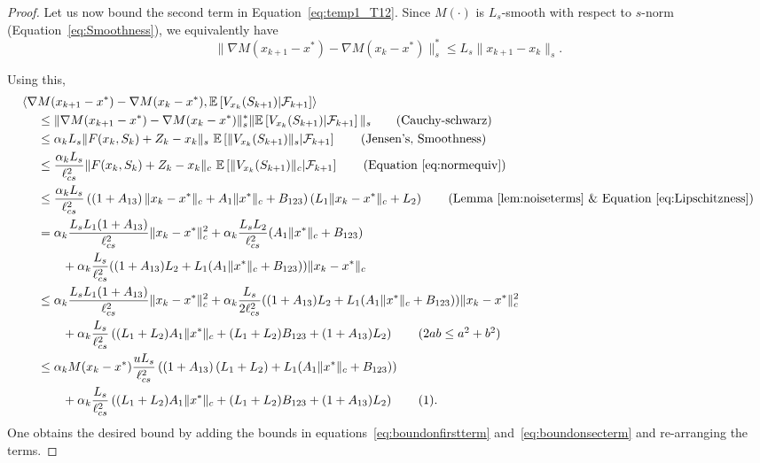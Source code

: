 \documentclass{article}
\newcommand{\numberthis}{\addtocounter{equation}{1}\tag{\theequation}}
\newcommand{\lrp}[1]{\left( #1 \right)}
\newcommand{\lrs}[1]{\left[ #1 \right]}
\newcommand{\E}[1]{\mathbb{E}\lrs{#1}}
\newcommand{\lcs}{\ell_{cs}}
\newcommand{\xk}{x_k}
\begin{document}
\begin{proof}
    Let us now bound the second term in Equation~\eqref{eq:temp1_T12}. Since $M(\cdot)$ is $L_s$-smooth with respect to $s$-norm (Equation~\eqref{eq:Smoothness}), we equivalently have \citep[Chapter 5]{beck2017first}
    \[ \|\nabla M(x_{k+1} - x^*) - \nabla M(x_k - x^*) \|^*_s  \le L_s\|x_{k+1}-x_k\|_s.\]

    Using this, 
    \begin{align*}
        \langle \nabla &M(x_{k+1} - x^*) - \nabla M(x_k - x^*), \E{ V_{x_k}(S_{k+1}) | \mathcal F_{k+1}} \rangle \\
        &\le \| \nabla M(x_{k+1} - x^*) - \nabla M(x_k - x^*)\|^*_{s} \| \E{ V_{x_k}(S_{k+1}) | \mathcal F_{k+1}} \|_s \tag{Cauchy-schwarz} \\
        &\le  \alpha_k L_s\|F(x_k, S_k) + Z_k - x_k\|_s ~\E{\|V_{x_k}(S_{k+1})\|_s  | \mathcal F_{k+1}} \tag{Jensen's, Smoothness}\\
        &\le \frac{\alpha_k L_s}{ \lcs^2 } \|F(x_k, S_k) + Z_k - x_k\|_c ~\E{\|V_{x_k}(S_{k+1})\|_c | \mathcal F_{k+1}} \tag{Equation~\eqref{eq:normequiv}} \\
        &\le \frac{\alpha_k L_s}{\lcs^2} \lrp{\lrp{1+A_{13}}\|\xk - x^*\|_c + A_{1} \|x^*\|_c  + B_{123}} \lrp{L_1 \|\xk - x^*\|_c + L_2}\tag{Lemma~\ref{lem:noiseterms} \& Equation~\eqref{eq:Lipschitzness}}\\
        &= \alpha_k\frac{ L_s L_1 (1+A_{13})}{\lcs^2} \|x_k - x^*\|^2_c + \alpha_k\frac{ L_s L_2}{\lcs^2}(A_{1}\|x^*\|_c + B_{123})  \\ 
        &\qquad + \alpha_k\frac{ L_s}{\lcs^2}((1+A_{13})L_2 + L_1 (A_{1}\|x^*\|_c + B_{123})) \|x_k - x^*\|_c\\
        &\le \alpha_k \frac{L_s L_1 (1+A_{13})}{\lcs^2} \|x_k - x^*\|^2_c + \alpha_k \frac{L_s}{2\lcs^2}((1+A_{13})L_2 + L_1 (A_{1}\|x^*\|_c + B_{123})) \|x_k - x^*\|^2_c \\
        &\qquad + \alpha_k \frac{L_s}{\lcs^2}\lrp{(L_1 + L_2)A_1 \|x^*\|_c + (L_1+L_2) B_{123} + (1+A_{13})L_2 } \tag{$2ab \le a^2 + b^2$}\\
        &\le \alpha_k  M(x_k - x^*) \frac{u L_s}{\lcs^2}\lrp{(1+ A_{13})\lrp{L_1 + L_2 }  + L_1 (A_1\|x^*\|_c + B_{123})} \\
        &\qquad + \alpha_k \frac{L_s}{\lcs^2}\lrp{(L_1 + L_2)A_1 \|x^*\|_c + (L_1+L_2) B_{123} + (1+A_{13})L_2}\numberthis\label{eq:boundonsecterm}.
    \end{align*}
    One obtains the desired bound by  adding the bounds in equations~\eqref{eq:boundonfirstterm} and~\eqref{eq:boundonsecterm} and re-arranging the terms.
\end{proof}
\end{document}
